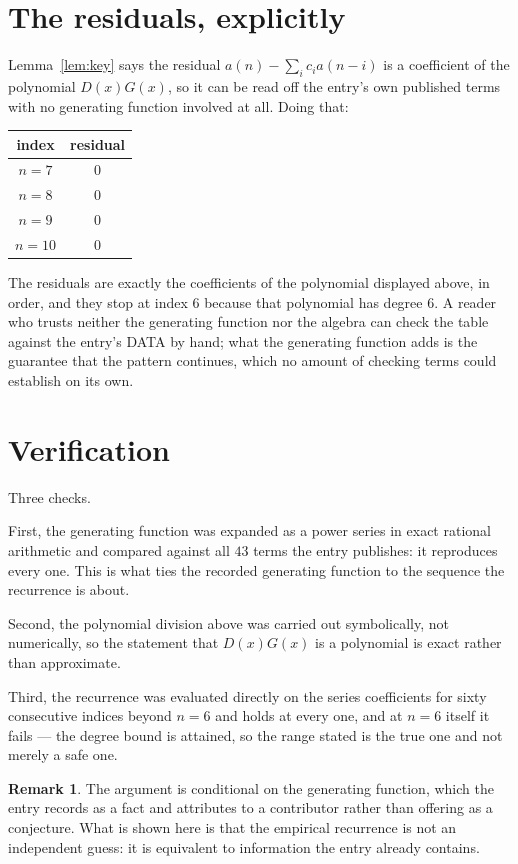 \documentclass[11pt,a4paper]{article}
\theoremstyle{plain}
\theoremstyle{definition}
\newtheorem{remark}[theorem]{Remark}
\begin{document}
\section{The residuals, explicitly}

Lemma~\ref{lem:key} says the residual $a(n)-\sum_ic_ia(n-i)$ is a coefficient of the
polynomial $D(x)G(x)$, so it can be read off the entry's own published terms with no
generating function involved at all. Doing that:
\begin{center}
\begin{tabular}{cc}
index & residual \\ \hline
$n=7$ & $0$ \\
$n=8$ & $0$ \\
$n=9$ & $0$ \\
$n=10$ & $0$
\end{tabular}
\end{center}
The residuals are exactly the coefficients of the polynomial displayed above, in order, and
they stop at index $6$ because that polynomial has degree $6$. A reader who trusts
neither the generating function nor the algebra can check the table against the entry's DATA
by hand; what the generating function adds is the guarantee that the pattern continues, which
no amount of checking terms could establish on its own.

\section{Verification}

Three checks.

First, the generating function was expanded as a power series in exact rational arithmetic and
compared against all $43$ terms the entry publishes: it reproduces every one. This is
what ties the recorded generating function to the sequence the recurrence is about.

Second, the polynomial division above was carried out symbolically, not numerically, so the
statement that $D(x)G(x)$ is a polynomial is exact rather than approximate.

Third, the recurrence was evaluated directly on the series coefficients for sixty consecutive
indices beyond $n=6$ and holds at every one, and at $n=6$ itself it fails --- the
degree bound is attained, so the range stated is the true one and not merely a safe one.

\begin{remark}
The argument is conditional on the generating function, which the entry records as a fact and
attributes to a contributor rather than offering as a conjecture. What is shown here is that
the empirical recurrence is not an independent guess: it is equivalent to information the
entry already contains.
\end{remark}
\end{document}
